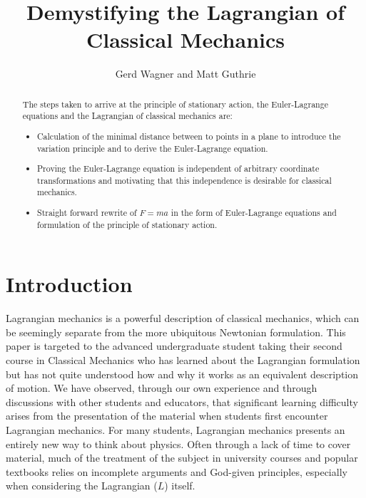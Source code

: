 \documentclass{article}
\begin{document}
\title{Demystifying the Lagrangian of Classical Mechanics} %
\author{Gerd Wagner and Matt Guthrie}

\maketitle

\begin{abstract} %
The steps taken to arrive at the principle of stationary action, the Euler-Lagrange equations and the Lagrangian of classical mechanics are:
\begin{itemize}
\item Calculation of the minimal distance between to points in a plane to introduce the variation principle and to derive the Euler-Lagrange equation.
\item Proving the Euler-Lagrange equation is independent of arbitrary coordinate transformations and motivating that this independence is desirable for classical mechanics.
\item Straight forward rewrite of $F=ma$ in the form of Euler-Lagrange equations and formulation of the principle of stationary action.
\end{itemize}
\end{abstract}


\section{Introduction}

Lagrangian mechanics is a powerful description of classical mechanics, which can be seemingly separate from the more ubiquitous Newtonian formulation. This paper is targeted to the advanced undergraduate student taking their second course in Classical Mechanics who has learned about the Lagrangian formulation but has not quite understood how and why it works as an equivalent description of motion. We have observed, through our own experience and through discussions with other students and educators, that significant learning difficulty arises from the presentation of the material when students first encounter Lagrangian mechanics. For many students, Lagrangian mechanics presents an entirely new way to think about physics. Often through a lack of time to cover material, much of the treatment of the subject in university courses and popular textbooks relies on incomplete arguments and God-given principles, especially when considering the Lagrangian ($L$) itself.
\end{document}
